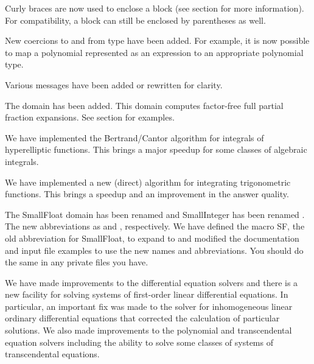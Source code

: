 Curly braces are now used to enclose a block (see section
for more information). For compatibility, a block can still be
enclosed by parentheses as well.


New coercions to and from type  have been
added. For example, it is now possible to map a polynomial
represented as an expression to an appropriate polynomial type.

Various messages have been added or rewritten for clarity.


The 
domain has been added. This domain computes factor-free full
partial fraction expansions.
See section
for examples.

We have implemented the Bertrand/Cantor algorithm for integrals of
hyperelliptic functions. This brings a major speedup for some
classes of algebraic integrals.

We have implemented a new (direct) algorithm for integrating trigonometric
functions. This brings a speedup and an improvement in the answer
quality.

The {\sf SmallFloat} domain has been renamed
 and {\sf SmallInteger} has been renamed
. The new abbreviations as
 and , respectively.
We have defined the macro {\sf SF}, the old abbreviation for {\sf
SmallFloat}, to expand to  and modified
the documentation and input file examples to use the new names
and abbreviations. You should do the same in any private \Language{}
files you have.

We have made improvements to the differential equation solvers
and there is a new facility for solving systems of first-order
linear differential equations.
In particular, an important fix was made to the solver for
inhomogeneous linear ordinary differential equations that
corrected the calculation of particular solutions.
We also made improvements to the polynomial
and transcendental equation solvers including the
ability to solve some classes of systems of transcendental
equations.

